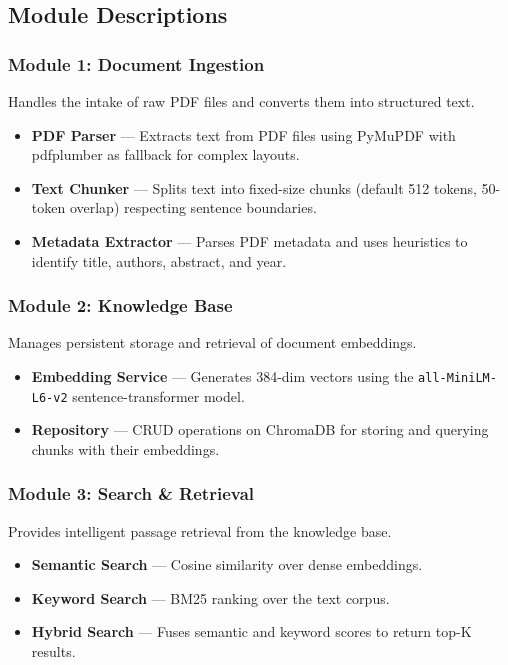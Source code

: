 \documentclass[12pt,a4paper]{article}
\begin{document}
\newpage

\subsection{Module Descriptions}

\subsubsection{Module 1: Document Ingestion}

Handles the intake of raw PDF files and converts them into structured text.
\begin{itemize}[leftmargin=2em]
    \item \textbf{PDF Parser} --- Extracts text from PDF files using PyMuPDF
          with pdfplumber as fallback for complex layouts.
    \item \textbf{Text Chunker} --- Splits text into fixed-size chunks
          (default 512 tokens, 50-token overlap) respecting sentence
          boundaries.
    \item \textbf{Metadata Extractor} --- Parses PDF metadata and uses
          heuristics to identify title, authors, abstract, and year.
\end{itemize}

\subsubsection{Module 2: Knowledge Base}

Manages persistent storage and retrieval of document embeddings.
\begin{itemize}[leftmargin=2em]
    \item \textbf{Embedding Service} --- Generates 384-dim vectors using
          the \texttt{all-MiniLM-L6-v2} sentence-transformer model.
    \item \textbf{Repository} --- CRUD operations on ChromaDB for storing
          and querying chunks with their embeddings.
\end{itemize}

\subsubsection{Module 3: Search \& Retrieval}

Provides intelligent passage retrieval from the knowledge base.
\begin{itemize}[leftmargin=2em]
    \item \textbf{Semantic Search} --- Cosine similarity over dense
          embeddings.
    \item \textbf{Keyword Search} --- BM25 ranking over the text corpus.
    \item \textbf{Hybrid Search} --- Fuses semantic and keyword scores
          to return top-K results.
\end{itemize}
\end{document}
